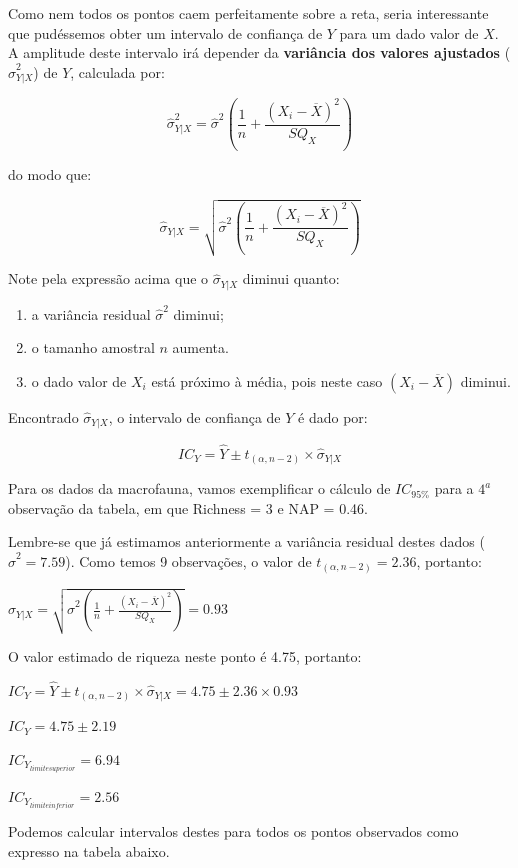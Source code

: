 \documentclass[
]{book}
\providecommand{\tightlist}{%
  \setlength{\itemsep}{0pt}\setlength{\parskip}{0pt}}
\begin{document}
Como nem todos os pontos caem perfeitamente sobre a reta, seria interessante que pudéssemos obter um intervalo de confiança de \(Y\) para um dado valor de \(X\). A amplitude deste intervalo irá depender da \textbf{variância dos valores ajustados} (\(\hat{\sigma}^2_{Y|X}\)) de \(Y\), calculada por:

\[\hat{\sigma}^2_{Y|X} = \hat{\sigma}^2(\frac{1}{n} + \frac{(X_i-\overline{X})^2}{SQ_X})\]

do modo que:

\[\hat{\sigma}_{Y|X} = \sqrt{\hat{\sigma}^2(\frac{1}{n} + \frac{(X_i-\overline{X})^2}{SQ_X})}\]

Note pela expressão acima que o \(\hat{\sigma}_{Y|X}\) diminui quanto:

\begin{enumerate}
\def\labelenumi{\arabic{enumi}.}
\tightlist
\item
  a variância residual \(\hat{\sigma}^2\) diminui;
\item
  o tamanho amostral \(n\) aumenta.
\item
  o dado valor de \(X_i\) está próximo à média, pois neste caso \((X_i-\overline{X})\) diminui.
\end{enumerate}

Encontrado \(\hat{\sigma}_{Y|X}\), o intervalo de confiança de \(Y\) é dado por:

\[IC_{Y} = \hat{Y}\pm t_{(\alpha, n-2)} \times \hat{\sigma}_{Y|X}\]

Para os dados da macrofauna, vamos exemplificar o cálculo de \(IC_{95\%}\) para a \(4^a\) observação da tabela, em que Richness = 3 e NAP = 0.46.

Lembre-se que já estimamos anteriormente a variância residual destes dados (\(\hat{\sigma}^2 = 7.59\)). Como temos 9 observações, o valor de \(t_{(\alpha, n-2)} = 2.36\), portanto:

\(\hat{\sigma}_{Y|X} = \sqrt{\hat{\sigma}^2(\frac{1}{n} + \frac{(X_i-\overline{X})^2}{SQ_X})} = 0.93\)

O valor estimado de riqueza neste ponto é 4.75, portanto:

\(IC_{Y} = \hat{Y} \pm t_{(\alpha, n-2)} \times \hat{\sigma}_{Y|X} = 4.75 \pm 2.36 \times 0.93\)

\(IC_{Y} = 4.75 \pm 2.19\)

\(IC_{Y_{limite superior}} = 6.94\)

\(IC_{Y_{limite inferior}} = 2.56\)

Podemos calcular intervalos destes para todos os pontos observados como expresso na tabela abaixo.
\end{document}
